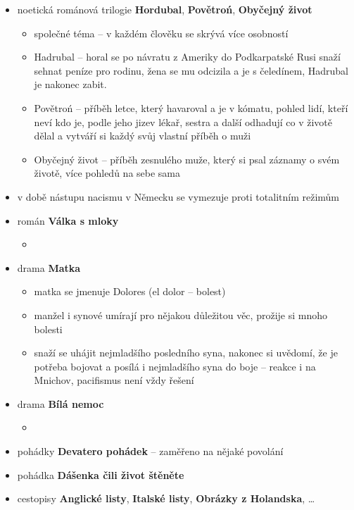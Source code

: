 \begin{itemize}
\item noetická románová trilogie \textbf{Hordubal}, \textbf{Povětroń}, \textbf{Obyčejný život}
	\begin{itemize}
	\item společné téma -- v každém člověku se skrývá více osobností
	\item Hadrubal -- horal se po návratu z Ameriky do Podkarpatské Rusi snaží sehnat peníze pro rodinu, žena se mu odcizila a je s čeledínem, Hadrubal je nakonec zabit.
	\item Povětroń -- příběh letce, který havaroval a je v kómatu, pohled lidí, kteří neví kdo je, podle jeho jizev lékař, sestra a další odhadují co v životě dělal a vytváří si každý svůj vlastní příběh o muži
	\item Obyčejný život -- příběh zesnulého muže, který si psal záznamy o svém životě, více pohledů na sebe sama
	\end{itemize}

\item v době nástupu nacismu v Německu se vymezuje proti totalitním režimům
\item román \textbf{Válka s mloky}
	\begin{itemize}
	\item 
	\end{itemize}
\item drama \textbf{Matka}
	\begin{itemize}
	\item matka se jmenuje Dolores (el dolor -- bolest)
	\item manžel i synové umírají pro nějakou důležitou věc, prožije si mnoho bolesti
	\item snaží se uhájit nejmladšího posledního syna, nakonec si uvědomí, že je potřeba bojovat a posílá i nejmladšího syna do boje -- reakce i na Mnichov, pacifismus není vždy řešení
	\end{itemize}
\item drama \textbf{Bílá nemoc}
	\begin{itemize}
	\item 
	\end{itemize}
\item pohádky \textbf{Devatero pohádek} -- zaměřeno na nějaké povolání
\item pohádka \textbf{Dášenka čili život štěněte}
\item cestopisy \textbf{Anglické listy}, \textbf{Italské listy}, \textbf{Obrázky z Holandska}, \ldots
\end{itemize}

